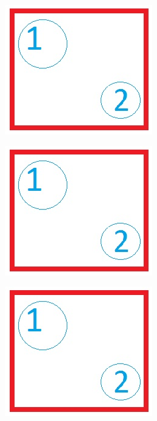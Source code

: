 \documentclass{article}
\begin{document}
\includegraphics[bb=13pt 65pt 63pt 115pt,clip]{clip-1-2.jpg}

\includegraphics[bb=13pt 65pt 63pt 115pt,clip]{clip-1-2.png}

\includegraphics[interpolate = true]{clip-1-2.jpg}
\end{document}
